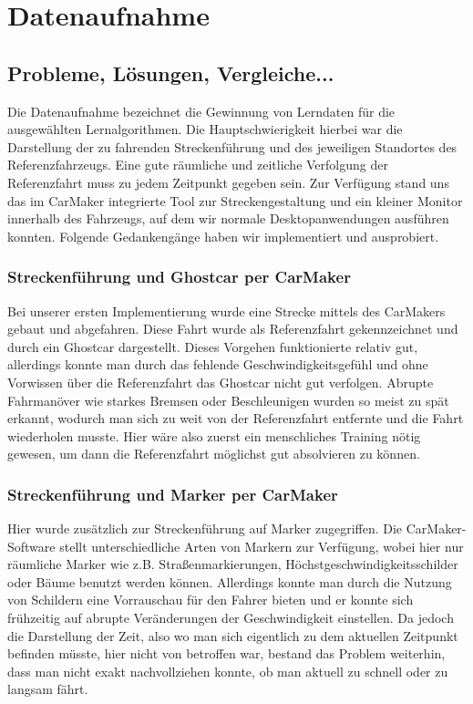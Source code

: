 
\chapter{Datenaufnahme} %
\label{cha:Datenaufnahme}

\section{Probleme, Lösungen, Vergleiche...} %
\label{sec:Probleme_Loesungen_Vergleiche}
Die Datenaufnahme bezeichnet die Gewinnung von Lerndaten für die ausgewählten Lernalgorithmen. Die Hauptschwierigkeit hierbei war die Darstellung der zu fahrenden Streckenführung und des jeweiligen Standortes des Referenzfahrzeugs. Eine gute räumliche und zeitliche Verfolgung der Referenzfahrt muss zu jedem Zeitpunkt gegeben sein. Zur Verfügung stand uns das im CarMaker integrierte Tool zur Streckengestaltung und ein kleiner Monitor innerhalb des Fahrzeugs, auf dem wir normale Desktopanwendungen ausführen konnten. Folgende Gedankengänge haben wir implementiert und ausprobiert.

\subsection{Streckenführung und Ghostcar per CarMaker}
\label{sec:Probleme_Loesungen_Vergleiche_ss1}
Bei unserer ersten Implementierung wurde eine Strecke mittels des CarMakers gebaut und abgefahren. Diese Fahrt wurde als Referenzfahrt gekennzeichnet und durch ein Ghostcar dargestellt.
Dieses Vorgehen funktionierte relativ gut, allerdings konnte man durch das fehlende Geschwindigkeitsgefühl und ohne Vorwissen über die Referenzfahrt das Ghostcar nicht gut verfolgen. Abrupte Fahrmanöver wie starkes Bremsen oder Beschleunigen wurden so meist zu spät erkannt, wodurch man sich zu weit von der Referenzfahrt entfernte und die Fahrt wiederholen musste. Hier wäre also zuerst ein menschliches Training nötig gewesen, um dann die Referenzfahrt möglichst gut absolvieren zu können.

\subsection{Streckenführung und Marker per CarMaker}
\label{sec:Probleme_Loesungen_Vergleiche_ss2}
Hier wurde zusätzlich zur Streckenführung auf Marker zugegriffen. Die CarMaker-Software stellt unterschiedliche Arten von Markern zur Verfügung, wobei hier nur räumliche Marker wie z.B.  Straßenmarkierungen, Höchstgeschwindigkeitsschilder oder Bäume benutzt werden können. Allerdings konnte man durch die Nutzung von Schildern eine Vorrauschau für den Fahrer bieten und er konnte sich frühzeitig auf abrupte Veränderungen der Geschwindigkeit einstellen. Da jedoch die Darstellung der Zeit, also wo man sich eigentlich zu dem aktuellen Zeitpunkt befinden müsste, hier nicht von betroffen war, bestand das Problem weiterhin, dass man nicht exakt nachvollziehen konnte, ob man aktuell zu schnell oder zu langsam fährt.


